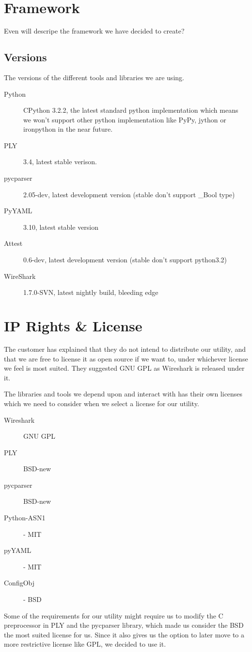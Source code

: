 \section{Framework}
\label{sec:pre:framework}
Even will descripe the framework we have decided to create?

\subsection{Versions}
The versions of the different tools and libraries we are using.
\begin{description}
	\item[Python] CPython 3.2.2, the latest standard python implementation
		which means we won’t support other python implementation like PyPy,
		jython or ironpython in the near future.
	\item[PLY] 3.4, latest stable verison.
	\item[pycparser] 2.05-dev, latest development version (stable don't
		support \_Bool type)
	\item[PyYAML] 3.10, latest stable version
	\item[Attest] 0.6-dev, latest development version (stable don’t
		support python3.2)
	\item[WireShark] 1.7.0-SVN, latest nightly build, bleeding edge
\end{description}


\section{IP Rights \& License}
\label{sec:pre:license}
The customer has explained that they do not intend to distribute our utility,
and that we are free to license it as open source if we want to, under
whichever license we feel is most suited. They suggested GNU GPL as Wireshark
is released under it.

The libraries and tools we depend upon and interact with has their own licenses
which we need to consider when we select a license for our utility.
\begin{description}
	\item[Wireshark] GNU GPL
	\item[PLY] BSD-new
	\item[pycparser] BSD-new
	\item[Python-ASN1] - MIT
	\item[pyYAML] - MIT
	\item[ConfigObj] - BSD
\end{description}

\noindent Some of the requirements for our utility might require us to modify
the C preprocessor in PLY and the pycparser library, which made us consider
the BSD the most suited license for us. Since it also gives us the option to
later move to a more restrictive license like GPL, we decided to use it.

